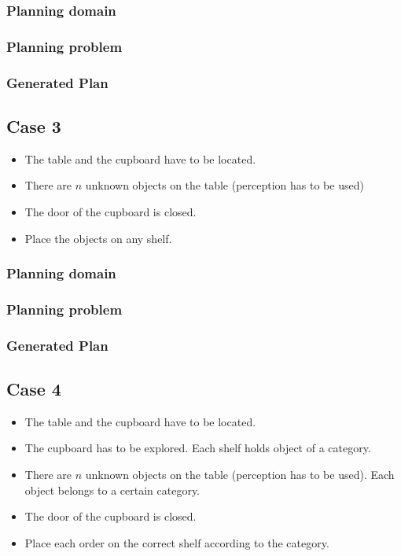 \documentclass[paper=a4, fontsize=11pt]{scrartcl}
\begin{document}
	\subsubsection*{Planning domain}
	
	\subsubsection*{Planning problem}
	
	\subsubsection*{Generated Plan}
	
	\subsection{Case 3}
	
		\begin{itemize}
			\item The table and the cupboard have to be located.
			\item There are $n$ unknown objects on the table (perception has to be used)
			\item The door of the cupboard is closed.
			\item Place the objects on any shelf.
		\end{itemize}
	
	\subsubsection*{Planning domain}
	
	\subsubsection*{Planning problem}
	
	\subsubsection*{Generated Plan}
	
	\subsection{Case 4}
	
		\begin{itemize}
			\item The table and the cupboard have to be located.
			\item The cupboard has to be explored. Each shelf holds object of a category.
			\item There are $n$ unknown objects on the table (perception has to be used). Each object belongs to a certain category.
			\item The door of the cupboard is closed.
			\item Place each order on the correct shelf according to the category.
		\end{itemize}
	
\end{document}
